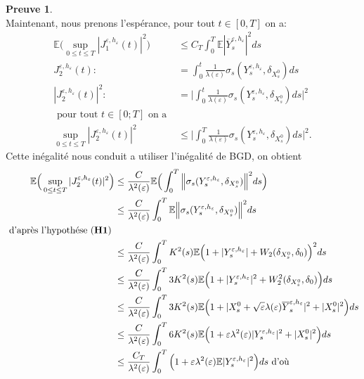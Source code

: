 \documentclass[12pt,a4paper,twoside]{report}%
\theoremstyle{definition}
\newtheorem*{pr}{\textbf{Preuve}}
\numberwithin{equation}{section}
\begin{document}
\begin{pr}
\[ \]
Maintenant, nous prenons l'espérance, pour tout $t\in [0,T]$ on a:
 \[
 \begin{aligned}
  \mathbb{E}\Big(\sup_{0 \leq t \leq T}|J_1^{\varepsilon,h_\varepsilon}(t)|^2
 \Big)&\leq C_T\int_{0}^{T}\mathbb{E}|\overline{Y}_s^{\varepsilon,h_\varepsilon}|^2ds\\
J_2^{\varepsilon,h_\varepsilon}(t) :& =\int_{0}^{t}\frac{1}{\lambda(\varepsilon)}\sigma_{s}(Y_s^{\varepsilon,h_\varepsilon},\delta_{X_s^0})ds\\
|J_2^{\varepsilon,h_\varepsilon}(t)|^2 : &= \Big|\int_{0}^{t}\frac{1}{\lambda(\varepsilon)}\sigma_{s}(Y_s^{\varepsilon,h_\varepsilon},\delta_{X_s^0})ds\Big| ^2\\
\text{ pour tout }t\in [0;T] \text{ on a }\\
\sup_{0 \leq t \leq T}|J_2^{\varepsilon,h_\varepsilon}(t)|^2&\leq \Big|\int_{0}^{T}\frac{1}{\lambda(\varepsilon)}\sigma_{s}(Y_s^{\varepsilon,h_\varepsilon},\delta_{X_s^0})ds\Big| ^2.
\end{aligned}
\]
Cette inégalité nous conduit a utiliser l'inégalité de BGD, on obtient
\[\begin{aligned}
\mathbb{E}\Big(\sup_{0 \leq t \leq T}|J_2^{\varepsilon,h_\varepsilon}(t)|^2\Big)&\leq \frac{C}{\lambda^2(\varepsilon)}\mathbb{E}\Big(\int_{0}^{T}\Big\|\sigma_s(Y^{\varepsilon,h_\varepsilon}_s,\delta_{X_{s}^{0}})\Big\|^2ds\Big) \\
&\leq \frac{C}{\lambda^2(\varepsilon)}\int_{0}^{T}\mathbb{E}\Big\|\sigma_s(Y^{\varepsilon,h_\varepsilon}_s,\delta_{X_{s}^{0}})\Big\|^2ds\\
\text{ d'après l'hypothése (\textbf{H1}) }\\
&\leq \frac{C}{\lambda^2(\varepsilon)}\int_{0}^{T}K^2(s)\mathbb{E}\Big(1+|Y_s^{\varepsilon,h_\varepsilon}|+W_2(\delta_{X_{s}^{0}},\delta_0)\Big)^2ds\\
&\leq \frac{C}{\lambda^2(\varepsilon)}\int_{0}^{T}3K^2(s)\mathbb{E}\Big(1+|Y_s^{\varepsilon,h_\varepsilon}|^2+W_2^2(\delta_{X_{s}^{0}},\delta_0)\Big)ds\\
&\leq \frac{C}{\lambda^2(\varepsilon)}\int_{0}^{T}3K^2(s)\mathbb{E}\Big(1 + |X_s^0 + \sqrt{\varepsilon}\lambda(\varepsilon)\overline{Y}_{s}^{\varepsilon,h_{\varepsilon}}|^2+|X_s^0|^2\Big)ds\\
&\leq \frac{C}{\lambda^2(\varepsilon)}\int_{0}^{T}6K^2(s)\mathbb{E}\Big(1+\varepsilon\lambda^2(\varepsilon) |Y_s^{\varepsilon,h_\varepsilon}|^2 + |X_s^0|^2\Big)ds\\
&\leq \frac{C_T}{\lambda^2(\varepsilon)}\int_{0}^{T}\Big(1+\varepsilon\lambda^2(\varepsilon)\mathbb{E}|Y_s^{\varepsilon,h_\varepsilon}|^2\Big)ds \text{ d'où }\\

\end{aligned}\]
\end{pr}
\end{document}
